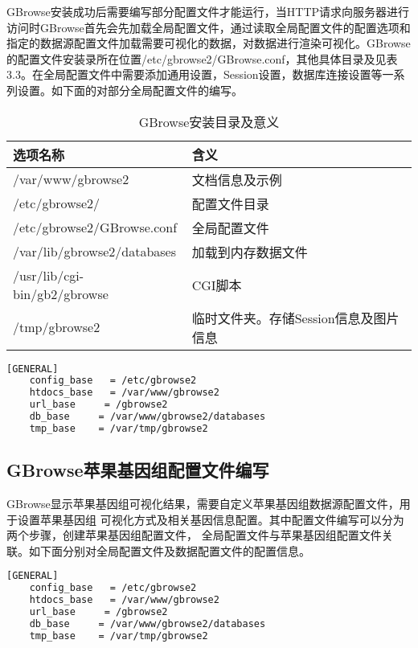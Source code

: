 	GBrowse安装成功后需要编写部分配置文件才能运行，当HTTP请求向服务器进行访问时GBrowse首先会先加载全局配置文件，通过读取全局配置文件的配置选项和指定的数据源配置文件加载需要可视化的数据，对数据进行渲染可视化。GBrowse的配置文件安装录所在位置/etc/gbrowse2/GBrowse.conf，其他具体目录及见表3.3。在全局配置文件中需要添加通用设置，Session设置，数据库连接设置等一系列设置。如下面的对部分全局配置文件的编写。
	\begin{table}[!htbp]
		\centering
		\begin{tabular}{ll}	
			\toprule
			选项名称& 含义\\
			\midrule
			/var/www/gbrowse2&文档信息及示例\\
			/etc/gbrowse2/&配置文件目录\\
			/etc/gbrowse2/GBrowse.conf&全局配置文件\\
			/var/lib/gbrowse2/databases&加载到内存数据文件 \\
			/usr/lib/cgi-bin/gb2/gbrowse&CGI脚本\\
			/tmp/gbrowse2&临时文件夹。存储Session信息及图片信息\\
			\bottomrule
		\end{tabular}
		\caption{GBrowse安装目录及意义}
	\end{table}
	\begin{lstlisting}[language=bash]
	[GENERAL]
	config_base   = /etc/gbrowse2   
	htdocs_base   = /var/www/gbrowse2
	url_base     = /gbrowse2
	db_base     = /var/www/gbrowse2/databases
	tmp_base    = /var/tmp/gbrowse2
	\end{lstlisting}
	\subsection{GBrowse苹果基因组配置文件编写}
	GBrowse显示苹果基因组可视化结果，需要自定义苹果基因组数据源配置文件，用于设置苹果基因组
	可视化方式及相关基因信息配置。其中配置文件编写可以分为两个步骤，创建苹果基因组配置文件，
	全局配置文件与苹果基因组配置文件关联。如下面分别对全局配置文件及数据配置文件的配置信息。
	\begin{lstlisting}[language=bash]
	[GENERAL]
	config_base   = /etc/gbrowse2   
	htdocs_base   = /var/www/gbrowse2
	url_base     = /gbrowse2
	db_base     = /var/www/gbrowse2/databases
	tmp_base    = /var/tmp/gbrowse2
	\end{lstlisting}
	
